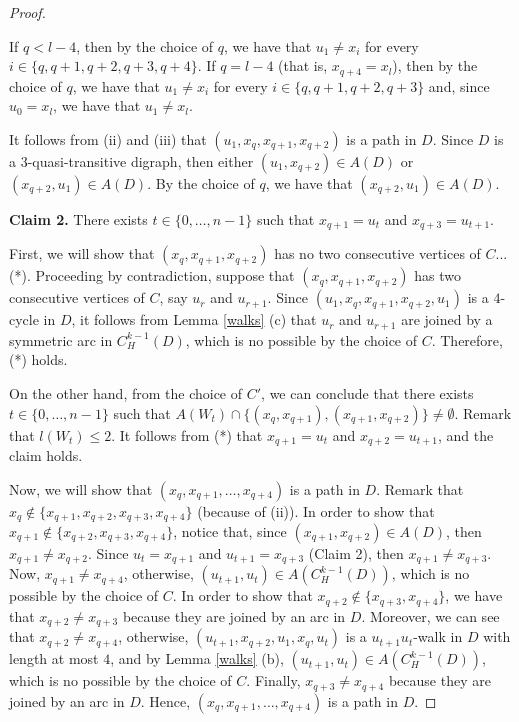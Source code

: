 \documentclass[10pt,a4paper]{article}
\begin{document}
\begin{proof}
\begin{enumerate}[(i)]
If $q < l-4$, then by the choice of $q$, we have that $u_{1} \neq x_{i}$ for every $i \in \{ q, q+1, q+2, q+3, q+4\}$. If $q=l-4$ (that is, $x_{q+4}=x_{l}$), then by the choice of $q$, we have that $u_{1} \neq x_{i}$ for every $i \in \{ q, q+1, q+2, q+3\}$ and, since $u_{0} = x_{l}$, we have that $u_{1} \neq x_{l}$.
\end{enumerate}

It follows from (ii) and (iii) that $(u_{1}, x_{q}, x_{q+1}, x_{q+2})$ is a path in $D$. Since $D$ is a $3$-quasi-transitive digraph, then either $(u_{1},x_{q+2}) \in A(D)$ or $(x_{q+2}, u_{1}) \in A(D)$. By the choice of $q$, we have that $(x_{q+2}, u_{1}) \in A(D)$.  

\begin{description}
\item \textbf{Claim 2.} There exists $t \in \{0, \ldots , n-1\}$ such that $x_{q+1} = u_{t}$ and $x_{q+3} = u_{t+1}$.

First, we will show that  $(x_{q}, x_{q+1}, x_{q+2})$ has no two consecutive vertices of $C$...(*). Proceeding by contradiction, suppose that $(x_{q}, x_{q+1}, x_{q+2})$ has two consecutive vertices of $C$, say $u_{r}$ and $u_{r+1}$. Since $(u_{1}, x_{q}, x_{q+1}, x_{q+2}, u_{1})$ is a $4$-cycle in $D$, it follows from Lemma \ref{walks} (c) that $u_{r}$ and $u_{r+1}$ are joined by a symmetric arc in $C_{H}^{k-1}(D)$, which is no possible by the choice of $C$. Therefore, (*) holds.

On the other hand, from the choice of $C'$, we can conclude that there exists $t \in \{0, \ldots , n-1\}$ such that $A(W_{t}) \cap \{ (x_{q}, x_{q+1}),(x_{q+1}, x_{q+2}) \} \neq \emptyset$. Remark that $l(W_{t}) \leq 2$. It follows from (*) that $x_{q+1} = u_{t}$ and $x_{q+2} = u_{t+1}$, and the claim holds.
\end{description}

Now, we will show that $(x_{q}, x_{q+1}, \ldots , x_{q+4})$ is a path in $D$. Remark that $x_{q} \notin \{ x_{q+1}, x_{q+2}, x_{q+3}, x_{q+4}\}$ (because of (ii)). In order to show that  $x_{q+1} \notin \{ x_{q+2}, x_{q+3}, x_{q+4}\}$, notice that, since $(x_{q+1}, x_{q+2}) \in A(D)$, then $x_{q+1} \neq x_{q+2}$. Since $u_{t} = x_{q+1}$ and $u_{t+1}=x_{q+3}$ (Claim 2), then $x_{q+1} \neq x_{q+3}$. Now, $x_{q+1} \neq x_{q+4}$, otherwise, $(u_{t+1}, u_{t}) \in A(C_{H}^{k-1}(D))$, which is no possible by the choice of $C$. In order to show that  $x_{q+2} \notin \{ x_{q+3}, x_{q+4}\}$, we have that $x_{q+2} \neq x_{q+3}$ because they are joined by an arc in $D$. Moreover, we can see that $x_{q+2} \neq  x_{q+4}$, otherwise, $(u_{t+1}, x_{q+2}, u_{1}, x_{q}, u_{t})$ is a $u_{t+1}u_{t}$-walk in $D$ with length at most $4$, and by Lemma \ref{walks} (b), $(u_{t+1}, u_{t}) \in A(C_{H}^{k-1}(D))$, which is no possible by the choice of $C$. Finally, $x_{q+3} \neq x_{q+4}$ because they are joined by an arc in $D$. Hence, $(x_{q}, x_{q+1}, \ldots , x_{q+4})$ is a path in $D$.


\end{proof}
\end{document}
